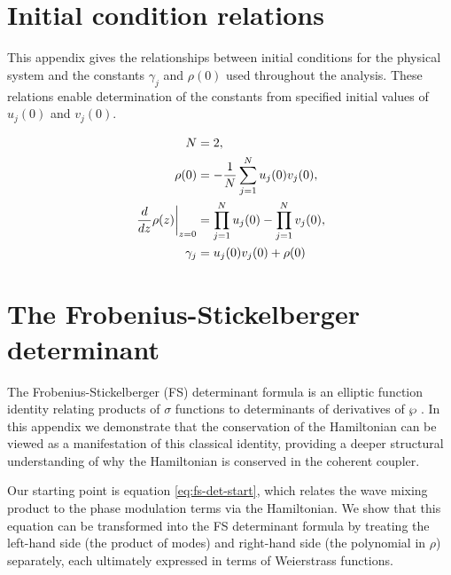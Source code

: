\documentclass[11pt,a4paper]{article}
\numberwithin{equation}{section}
\begin{document}

\section{Initial condition relations}
\label{app:init-conds}

This appendix gives the relationships between initial conditions for the physical system and the constants $\gamma_j$ and $\rho(0)$ used throughout the analysis.
These relations enable determination of the constants from specified initial values of $u_j(0)$ and $v_j(0)$.

\begin{align}
N &= 2, \notag \\
\rho{\left(0 \right)} &= - \frac{1}{N}\sum_{j=1}^{N} u_j{\left(0 \right)} v_j{\left(0 \right)}, \notag \\
\left. \frac{d}{d z} \rho{\left(z \right)} \right|_{\substack{ z=0 }} &= \prod_{j=1}^{N} u_j(0) - \prod_{j=1}^{N} v_j(0), \notag \\
{\gamma}_{j} &= u_j{\left(0\right)} v_j{\left(0 \right)} + \rho{\left(0 \right)}
\end{align}



\section{The Frobenius-Stickelberger determinant}
\label{app:fs-det-ham-proof}

The Frobenius-Stickelberger (FS) determinant formula is an elliptic function identity relating products of $\sigma$ functions to determinants of derivatives of $\wp$ \cite{whittakerCourseModernAnalysis2021, frobeniusZurTheorieElliptischen1877}.
In this appendix we demonstrate that the conservation of the Hamiltonian can be viewed as a manifestation of this classical identity, providing a deeper structural understanding of why the Hamiltonian is conserved in the coherent coupler.

Our starting point is equation \eqref{eq:fs-det-start}, which relates the wave mixing product to the phase modulation terms via the Hamiltonian.
We show that this equation can be transformed into the FS determinant formula by treating the left-hand side (the product of modes) and right-hand side (the polynomial in $\rho$) separately, each ultimately expressed in terms of Weierstrass functions.
\end{document}
